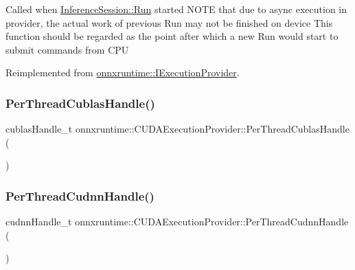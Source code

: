 Called when \mbox{\hyperlink{classonnxruntime_1_1InferenceSession_a90aa8b5fdc2638c4d2c45afc9c3ed222}{Inference\+Session\+::\+Run}} started N\+O\+TE that due to async execution in provider, the actual work of previous Run may not be finished on device This function should be regarded as the point after which a new Run would start to submit commands from C\+PU 

Reimplemented from \mbox{\hyperlink{classonnxruntime_1_1IExecutionProvider_a0d724b727c4518125b5b154b481bccb3}{onnxruntime\+::\+I\+Execution\+Provider}}.

\mbox{\label{classonnxruntime_1_1CUDAExecutionProvider_a3f8178414579cf4207dd34afc75438f6}} 
\subsubsection{\texorpdfstring{Per\+Thread\+Cublas\+Handle()}{PerThreadCublasHandle()}}
{\footnotesize\ttfamily cublas\+Handle\+\_\+t onnxruntime\+::\+C\+U\+D\+A\+Execution\+Provider\+::\+Per\+Thread\+Cublas\+Handle (\begin{DoxyParamCaption}{ }\end{DoxyParamCaption})\hspace{0.3cm}{\ttfamily [inline]}}

\mbox{\label{classonnxruntime_1_1CUDAExecutionProvider_a9e4e2ca076bb0fa560eac0bd88ab27fa}} 
\subsubsection{\texorpdfstring{Per\+Thread\+Cudnn\+Handle()}{PerThreadCudnnHandle()}}
{\footnotesize\ttfamily cudnn\+Handle\+\_\+t onnxruntime\+::\+C\+U\+D\+A\+Execution\+Provider\+::\+Per\+Thread\+Cudnn\+Handle (\begin{DoxyParamCaption}{ }\end{DoxyParamCaption})\hspace{0.3cm}{\ttfamily [inline]}}

